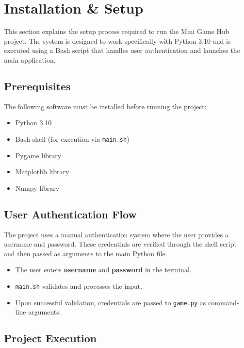 \documentclass[12pt]{article}
\begin{document}
\section{Installation \& Setup}

This section explains the setup process required to run the Mini Game Hub project. The system is designed to work specifically with Python 3.10 and is executed using a Bash script that handles user authentication and launches the main application.

\subsection{Prerequisites}

The following software must be installed before running the project:

\begin{itemize}
    \item Python 3.10 
    \item Bash shell (for execution via \texttt{main.sh})
    \item Pygame library
    \item Matplotlib library
    \item Numpy library
\end{itemize}

\subsection{User Authentication Flow}

The project uses a manual authentication system where the user provides a username and password. These credentials are verified through the shell script and then passed as arguments to the main Python file.

\begin{itemize}
    \item The user enters \textbf{username} and \textbf{password} in the terminal.
    \item \texttt{main.sh} validates and processes the input.
    \item Upon successful validation, credentials are passed to \texttt{game.py} as command-line arguments.
\end{itemize}

\subsection{Project Execution}
\end{document}

